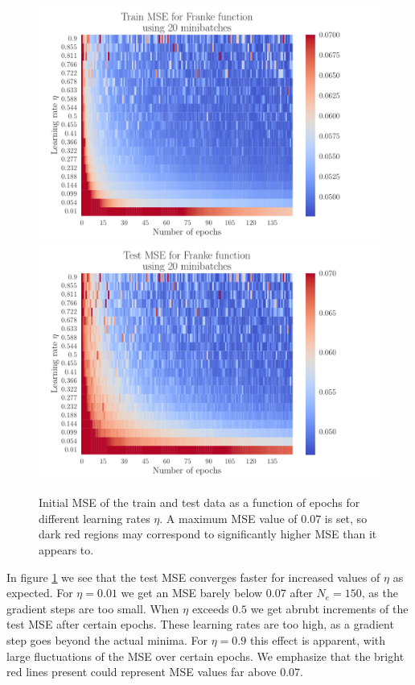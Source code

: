 \documentclass[12pt]{extarticle}
\begin{document}
\begin{figure}[h!]
	\includegraphics[width=\linewidth]{SGD_Franke/reg_Franke__epochs_eta__Train_MSE__overfit_489047.pdf}
	\includegraphics[width=\linewidth]{SGD_Franke/reg_Franke__epochs_eta__Test_MSE__overfit_395885.pdf}
	\caption{Initial MSE of the train and test data as a function of epochs for different learning rates $\eta$. A maximum MSE value of $0.07$ is set, so dark red regions may correspond to significantly higher MSE than it appears to.}
	\label{fig:SGD_Franke_epochs_eta_overfit}
\end{figure}

In figure \ref{fig:SGD_Franke_epochs_eta_overfit} we see that the test MSE converges faster for increased values of $\eta$ as expected. For $\eta=0.01$ we get an MSE barely below $0.07$ after $N_e=150$, as the gradient steps are too small. When $\eta$ exceeds $0.5$ we get abrubt increments of the test MSE after certain epochs. These learning rates are too high, as a gradient step goes beyond the actual minima. For $\eta=0.9$ this effect is apparent, with large fluctuations of the MSE over certain epochs. We emphasize that the bright red lines present could represent MSE values far above $0.07$.
\end{document}
